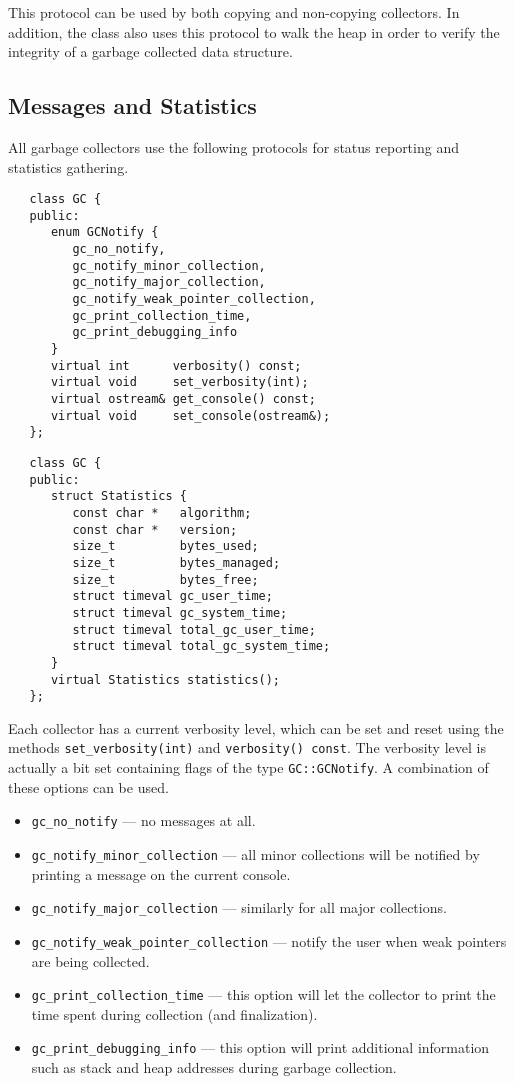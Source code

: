 This protocol can be used by both copying and non-copying collectors.
In addition, the class  also uses this protocol to 
walk the heap in order to verify the integrity of a garbage collected 
data structure.

\subsection{Messages and Statistics}
    All garbage collectors use the following protocols for status
reporting and statistics gathering.  
  
\begin{verbatim}
   class GC {
   public:
      enum GCNotify {
         gc_no_notify,             
         gc_notify_minor_collection,
         gc_notify_major_collection,
         gc_notify_weak_pointer_collection,
         gc_print_collection_time,
         gc_print_debugging_info
      }
      virtual int      verbosity() const;
      virtual void     set_verbosity(int);
      virtual ostream& get_console() const;
      virtual void     set_console(ostream&);
   };
\end{verbatim}

\begin{verbatim}
   class GC {
   public:
      struct Statistics {
         const char *   algorithm;
         const char *   version;
         size_t         bytes_used;
         size_t         bytes_managed;
         size_t         bytes_free;
         struct timeval gc_user_time;
         struct timeval gc_system_time;
         struct timeval total_gc_user_time;
         struct timeval total_gc_system_time;
      }
      virtual Statistics statistics();
   };
\end{verbatim}

    Each collector has a current verbosity level, which can be set
and reset using the methods \verb|set_verbosity(int)| and
\verb|verbosity() const|.  The verbosity level is actually a bit
set containing flags of the type \verb|GC::GCNotify|.  A combination
of these options can be used.
\begin{itemize}
  \item \verb|gc_no_notify| --- no messages at all.
  \item \verb|gc_notify_minor_collection| --- all minor collections
    will be notified by printing a message on the current console.
  \item \verb|gc_notify_major_collection| --- similarly for all major
    collections.
  \item \verb|gc_notify_weak_pointer_collection| --- notify the user
  when weak pointers are being collected.
  \item \verb|gc_print_collection_time| --- this option will let the
    collector to print the time spent during collection (and finalization).
  \item \verb|gc_print_debugging_info| --- this option will print additional
    information such as stack and heap addresses during garbage collection.
\end{itemize}

